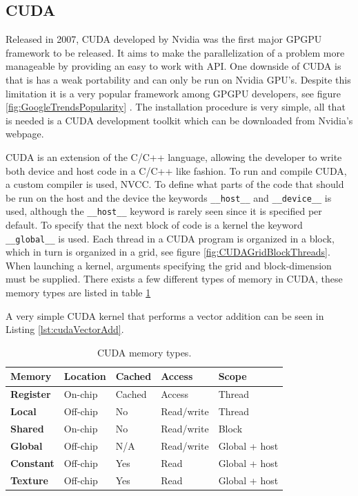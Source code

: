 \subsection{CUDA}
Released in 2007, CUDA developed by Nvidia was the first major GPGPU framework to be released. It aims to make the parallelization of a problem more manageable by providing an easy to work with API. One downside of CUDA is that is has a weak portability and can only be run on Nvidia GPU's. Despite this limitation it is a very popular framework among GPGPU developers, see figure \ref{fig:GoogleTrendsPopularity} \cite{AboutCuda}.  The installation procedure is very simple, all that is needed is a CUDA development toolkit which can be downloaded from Nvidia's webpage.

CUDA is an extension of the C/C++ language, allowing the developer to write both device and host code in a C/C++ like fashion. To run and compile CUDA, a custom compiler is used, NVCC. To define what parts of the code that should be run on the host and the device the keywords \lstinline{__host__} and \lstinline{__device__} is used, although the \lstinline{__host__} keyword is rarely seen since it is specified per default. To specify that the next block of code is a kernel the keyword \lstinline{__global__} is used.
Each thread in a CUDA program is organized in a block, which in turn is organized in a grid, see figure \ref{fig:CUDAGridBlockThreads}. When launching a kernel, arguments specifying the grid and block-dimension must be supplied. There exists a few different types of memory in CUDA, these memory types are listed in table \ref{tab:CUDAMemoryTypes} 

A very simple CUDA kernel that performs a vector addition can be seen in Listing \ref{lst:cudaVectorAdd}.

\begin{table}

    \begin{tabularx}{\textwidth}{ |X|X|X|X|X| }
      \hline
      \rowcolor{gray}
      \textbf{Memory} &  \textbf{Location} &  \textbf{Cached} &    \textbf{Access} &    \textbf{Scope} \\ \hline 
      \textbf{Register} & On-chip   & Cached    & Access        & Thread \\ \hline 
      \textbf{Local}    & Off-chip  & No        & Read/write    & Thread \\ \hline 
      \textbf{Shared}   & On-chip   & No        & Read/write    & Block \\ \hline 
      \textbf{Global}   & Off-chip  & N/A       & Read/write    & Global + host \\ \hline 
      \textbf{Constant} & Off-chip  & Yes       & Read          & Global + host \\ \hline 
      \textbf{Texture}  & Off-chip  & Yes       & Read          & Global + host \\ \hline 
    \end{tabularx}

\caption{\label{tab:CUDAMemoryTypes} CUDA memory types.}
\end{table}

